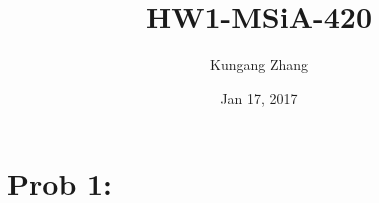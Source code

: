 \documentclass[11pt, oneside]{article}   	%
\title{HW1-MSiA-420}
\author{Kungang Zhang}
\date{Jan 17, 2017}							%
\begin{document}
\maketitle
\section{Prob 1:}




\end{document}

